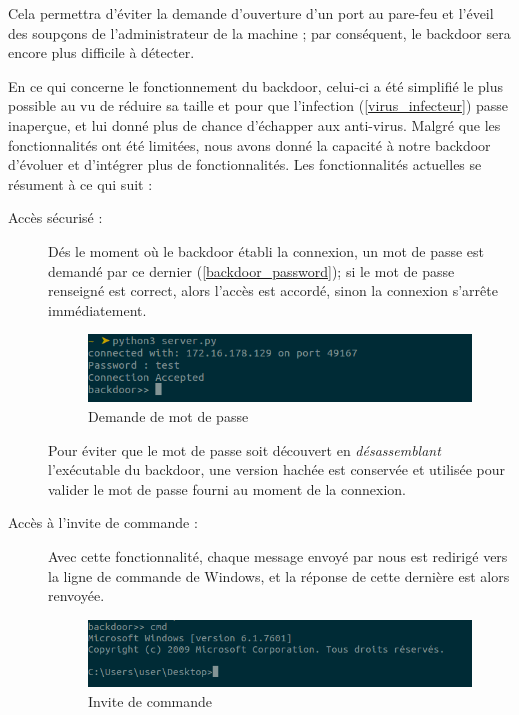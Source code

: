         Cela permettra d'éviter la demande
        d'ouverture d'un port au pare-feu et l'éveil des soupçons de l'administrateur de la machine ; 
        par conséquent, le backdoor sera encore plus difficile à détecter.%

        En ce qui concerne le fonctionnement du backdoor, celui-ci a été simplifié le plus possible au vu de réduire 
        sa taille et pour que l'infection (\autoref{virus_infecteur}) passe inaperçue, et lui donné plus de 
        chance d'échapper aux anti-virus. 
        Malgré que les fonctionnalités ont été limitées, nous avons donné la capacité à notre backdoor 
        d'évoluer et d’intégrer plus de fonctionnalités.
        Les fonctionnalités actuelles se résument à ce qui suit : 

        \begin{description}
            \item[Accès sécurisé :] Dés le moment où le backdoor établi la connexion, un mot de passe est
                demandé par ce dernier (\autoref{backdoor_password}); si le mot de passe renseigné est correct, 
                alors l'accès est accordé, sinon la connexion s'arrête immédiatement. %

                \begin{figure}[h!]
                    \centering
                    \includegraphics[width=0.9\linewidth]{images/backdoor_password.png}
                    \caption{Demande de mot de passe}
                    \label{backdoor_password}
                \end{figure}

                Pour éviter que le mot de passe soit découvert en \emph{désassemblant} l'exécutable du backdoor,
                une version hachée est conservée et utilisée pour valider le mot de passe fourni au moment de la 
                connexion. %

            \item[Accès à l'invite de commande :] Avec cette fonctionnalité, 
                chaque message envoyé par nous est redirigé vers la ligne 
                de commande de Windows, et la réponse de cette dernière est alors renvoyée.
                \begin{figure}[h!]
                    \centering
                    \includegraphics[width=0.9\linewidth]{images/backdoor_cmd.png}
                    \caption{Invite de commande}
                    \label{backdoor_cmd}
                \end{figure}


\end{description}
